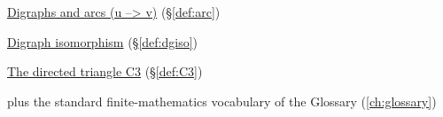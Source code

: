 \begin{closurepanel}
\item \hyperref[def:arc]{Digraphs and arcs (u --> v)} (\S\ref*{def:arc})
\item \hyperref[def:dgiso]{Digraph isomorphism} (\S\ref*{def:dgiso})
\item \hyperref[def:C3]{The directed triangle C3} (\S\ref*{def:C3})
\item plus the standard finite-mathematics vocabulary of the Glossary (\cref{ch:glossary})
\end{closurepanel}
